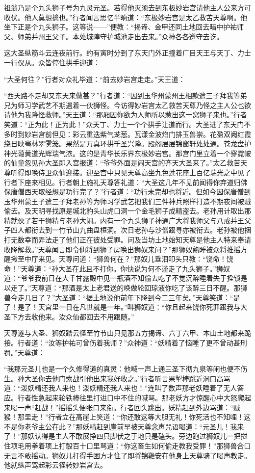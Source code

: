 \documentclass[12pt,UTF8]{ctexbook}
\begin{document}
{	祖翁乃是个九头狮子号为九灵元圣。若得他灭须去到东极妙岩宫请他主人公来方可收伏。他人莫想擒也。”行者闻言思忆半晌道：“东极妙岩宫是太乙救苦天尊啊。他坐下正是个九头狮子。这等说——”便教：“揭谛、金甲还同土地回去暗中护祐师父、师弟并州王父子。本处城隍守护城池走出去来。”众神各各遵守去讫。
	
	这大圣纵筋斗云连夜前行。约有寅时分到了东天门外正撞着广目天王与天丁、力士一行仪从。众皆停住拱手迎道：
	
	“大圣何往？”行者对众礼毕道：“前去妙岩宫走走。”天王道：
	
	“西天路不走却又东天来做甚？”行者道：“因到玉华州蒙州王相款遣三子拜我等弟兄为师习学武艺不期遇着一伙狮怪。今访得妙岩宫太乙救苦天尊乃怪之主人公也欲请他为我降怪救师。”天王道：“那厢因你欲为人师所以惹出这一窝狮子来也。”行者笑道：“正为此！正为此！”众天丁、力士一个个拱手让道而行。大圣进了东天门不多时到妙岩宫前但见：彩云重迭紫气茏葱。瓦漾金波焰门排玉兽崇。花盈双阙红霞绕日映骞林翠雾笼。果然是万真环拱千圣兴隆。殿阁层层锦窗轩处处通。苍龙盘护神光蔼黄道光辉瑞气浓。这的是青华长乐界东极妙岩宫。那宫门里立着一个穿霓帔的仙童忽见孙大圣即入宫报道：“爷爷外面是闹天宫的齐天大圣来了。”太乙救苦天尊听得即唤侍卫众仙迎接。迎至宫中只见天尊高坐九色莲花座上百亿瑞光之中见了行者下座来相见。行者朝上施礼天尊答礼道：“大圣这几年不见前闻得你弃道归佛保唐僧西天取经想是功行完了？”行者道：“功行未完却也将近。但如今因保唐僧到玉华州蒙王子遣三子拜老孙等为师习学武艺把我们三件神兵照样打造不期夜间被贼偷去。及天明寻找原是城北豹头山虎口洞一个金毛狮子成精盗去。老孙用计取出那精就伙了若干狮精与老孙大闹。内有一个九头狮子神通广大将我师父与八戒并王父子四人都衔去到一竹节山九曲盘桓洞。次日老孙与沙僧跟寻亦被衔去。老孙被他捆打无数幸而弄法走了他们正在彼处受罪。问及当坊土地始知天尊是他主人特来奉请收降解救。”天尊闻言即令仙将到狮子房唤出狮奴来问？”那狮奴熟睡被众将推摇方醒揪至中厅来见。天尊问道：“狮兽何在？”那奴儿垂泪叩头只教：“饶命！饶命！”天尊道：“孙大圣在此且不打你。你快说为何不谨走了九头狮子。”狮奴道：“爷爷我前日在大千甘露殿中见一瓶酒不知偷去吃了不觉沉醉睡着失于拴锁是以走了。”天尊道：“那酒是太上老君送的唤做轮回琼液你吃了该醉三日不醒。那狮兽今走几日了？”大圣道：“据土地说他前年下降到今二三年矣。”天尊笑道：“是了！是了！天宫里一日在凡世就是一年。”叫狮奴道：“你且起来饶你死罪跟我与大圣下方去收他来。汝众仙都回去不用跟随。”
	
	天尊遂与大圣、狮奴踏云径至竹节山只见那五方揭谛、六丁六甲、本山土地都来跪接。行者道：“汝等护祐可曾伤着我师？”众神道：“妖精着了恼睡了更不曾动甚刑罚。”天尊道：
	
	“我那元圣儿也是一个久修得道的真灵：他喊一声上通三圣下彻九泉等闲也便不伤生。孙大圣你去他门索战引他出来我好收之。”行者听言果掣棒跳近洞口高骂道：“泼妖精还我人来也！泼妖精还我人来也！”连叫了数声那老妖睡着了无人答应。行者性急起来轮铁棒往里打进口中不住的喊骂。那老妖方才惊醒心中大怒爬起来喝一声“赶战！”摇摇头便张口来衔。行者回头跳出。妖精赶到外边骂道：“贼猴！那里走！”行者立在高崖上笑道：“你还敢这等大胆无礼！你死活也不知哩！这不是你老爷主公在此？”那妖精赶到崖前早被天尊念声咒语喝道：“元圣儿！我来了！”那妖认得是主人不敢展挣四只脚伏之于地只是磕头。旁边跑过狮奴儿一把挝住项毛用拳着项上打彀百十口里骂道：“你这畜生如何偷走教我受罪！”那狮兽合口无言不敢摇动。狮奴儿打得手困方才住了即将锦韂安在他身上天尊骑了喝声教走。他就纵声驾起彩云径转妙岩宫去。
	
}
\end{document}

